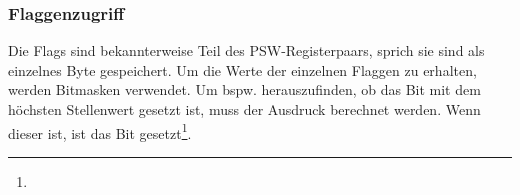 \subsubsection{Flaggenzugriff}

Die Flags sind bekannterweise Teil des PSW-Registerpaars, sprich sie sind als einzelnes Byte gespeichert. Um die Werte der einzelnen Flaggen zu erhalten, werden Bitmasken verwendet. Um bspw. herauszufinden, ob das Bit mit dem höchsten Stellenwert gesetzt ist, muss der Ausdruck  berechnet werden. Wenn dieser  ist, ist das Bit gesetzt\footnote{}.

